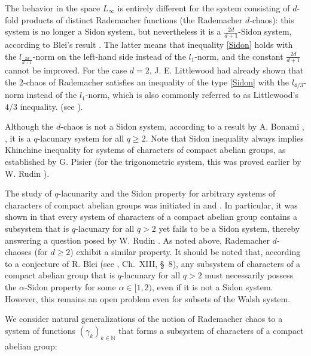 \documentclass[12pt]{article}
\begin{document}
	The behavior in the space $L_{\infty}$ is entirely different for the system consisting of $d$-fold products of distinct Rademacher functions (the Rademacher $d$-chaos): this system is no longer a Sidon system, but nevertheless it is a $\frac{2d}{d+1}$-Sidon system, according to Blei's result \cite[Chap. VII]{Blei}. The latter means that inequality \eqref{Sidon} holds with the $l_{\frac{2d}{d+1}}$-norm on the left-hand side instead of the $l_1$-norm, and the constant $\frac{2d}{d+1}$ cannot be improved. For the case $d=2$, J. E. Littlewood had already shown that the $2$-chaos of Rademacher satisfies an inequality of the type \eqref{Sidon} with the $l_{4/3}$-norm instead of the $l_1$-norm, which is also commonly referred to as Littlewood's $4/3$ inequality. (see \cite[Sec. 6]{Astashkin-2017}).
	
	Although the $d$-chaos is not a Sidon system, according to a result by A. Bonami \cite{Bonami}, \cite{Bonami2}, it is a $q$-lacunary system for all $q \ge 2$. Note that Sidon inequality always implies Khinchine inequality for systems of characters of compact abelian groups, as established by G. Pisier \cite{Pisier} (for the trigonometric system, this was proved earlier by W. Rudin \cite{Rudin-1960}). 
	
The study of $q$-lacunarity and the Sidon property for arbitrary systems of characters of compact abelian groups was initiated in \cite{EHR} and \cite{EHR2}. In particular, it was shown in \cite{EHR} that every system of characters of a compact abelian group contains a subsystem that is $q$-lacunary for all $q > 2$ yet fails to be a Sidon system, thereby answering a question posed by W. Rudin \cite{Rudin-1960}. As noted above, Rademacher $d$-chaoses (for $d \ge 2$) exhibit a similar property. It should be noted that, according to a conjecture of R. Blei (see \cite{Blei}, Ch.~XIII, \S~8), any subsystem of characters of a compact abelian group that is $q$-lacunary for all $q > 2$ must necessarily possess the $\alpha$-Sidon property for some $\alpha \in [1, 2)$, even if it is not a Sidon system. However, this remains an open problem even for subsets of the Walsh system.
	
We consider natural generalizations of the notion of Rademacher chaos to a system of functions $(\gamma_k)_{k\in\mathbb{N}}$ that forms a subsystem of characters of a compact abelian group:
	
\end{document}

